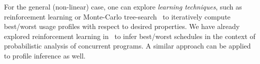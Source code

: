For the general (non-linear) case, one can explore {\em learning
  techniques}, such as reinforcement learning or Monte-Carlo
tree-search~\cite{sutton1998reinforcement} to iteratively compute
best/worst usage profiles with respect to desired properties. We have
already explored reinforcement learning in~\cite{luckow2014probabilistic} to
infer best/worst schedules in the context of probabilistic analysis of
concurrent programs. A similar approach can be applied to profile
inference as well. 



